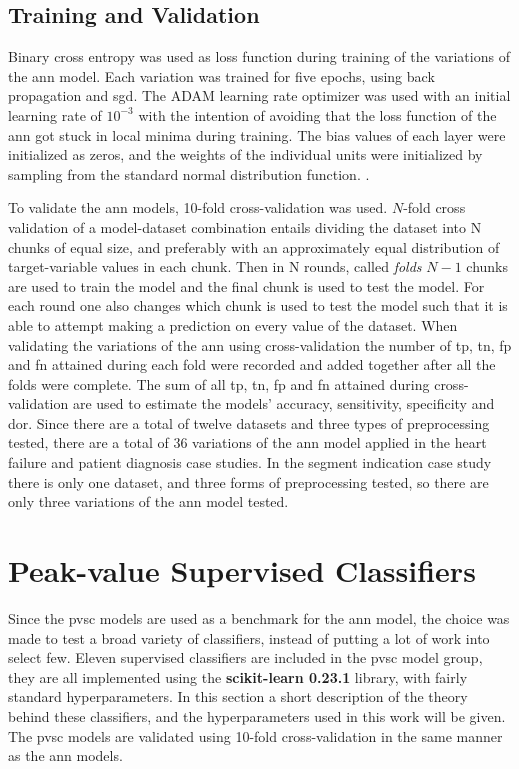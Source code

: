 \subsection{Training and Validation}

Binary cross entropy was used as loss function during training of the variations of the \acrshort{ann} model. Each variation was trained for five epochs, using back propagation and \acrshort{sgd}. The ADAM learning rate optimizer was used with an initial learning rate of $10^{-3}$ with the intention of avoiding that the loss function of the \acrshort{ann} got stuck in local minima during training. The bias values of each layer were initialized as zeros, and the weights of the individual units were initialized by sampling from the standard normal distribution function. \bigskip. 

To validate the \acrshort{ann} models, 10-fold cross-validation was used. $N$-fold cross validation of a model-dataset combination entails dividing the dataset into N chunks of equal size, and preferably with an approximately equal distribution of target-variable values in each chunk. Then in N rounds, called \textit{folds} $N-1$ chunks are used to train the model and the final chunk is used to test the model. For each round one also changes which chunk is used to test the model such that it is able to attempt making a prediction on every value of the dataset. When validating the variations of the \acrshort{ann} using cross-validation the number of \acrshort{tp}, \acrshort{tn}, \acrshort{fp} and \acrshort{fn} attained during each fold were recorded and added together after all the folds were complete. The sum of all \acrshort{tp}, \acrshort{tn}, \acrshort{fp} and \acrshort{fn} attained during cross-validation are used to estimate the models' accuracy, sensitivity, specificity and \acrshort{dor}. Since there are a total of twelve datasets and three types of preprocessing tested, there are a total of 36 variations of the \acrshort{ann} model applied in the heart failure and patient diagnosis case studies. In the segment indication case study there is only one dataset, and three forms of preprocessing tested, so there are only three variations of the \acrshort{ann} model tested.

\section{Peak-value Supervised Classifiers} \label{sec:meth_pvsc}

Since the \acrshort{pvsc} models are used as a benchmark for the \acrshort{ann} model, the choice was made to test a broad variety of classifiers, instead of putting a lot of work into select few. Eleven supervised classifiers are included in the \acrshort{pvsc} model group, they are all implemented using the \textbf{scikit-learn 0.23.1} library, with fairly standard hyperparameters. In this section a short description of the theory behind these classifiers, and the hyperparameters used in this work will be given. The \acrshort{pvsc} models are validated using 10-fold cross-validation in the same manner as the \acrshort{ann} models.

